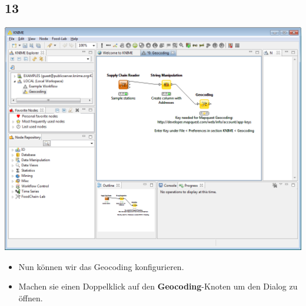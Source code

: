 \documentclass{beamer}
\begin{document}
\subsection{13}
\begin{frame}
	\begin{center}
  		\includegraphics[height=0.6\textheight]{13.png}
	\end{center}
	\begin{itemize}
		\item Nun können wir das Geocoding konfigurieren.
		\item Machen sie einen Doppelklick auf den \textbf{Geocoding}-Knoten um den Dialog zu öffnen.
	\end{itemize}
\end{frame}
\end{document}
